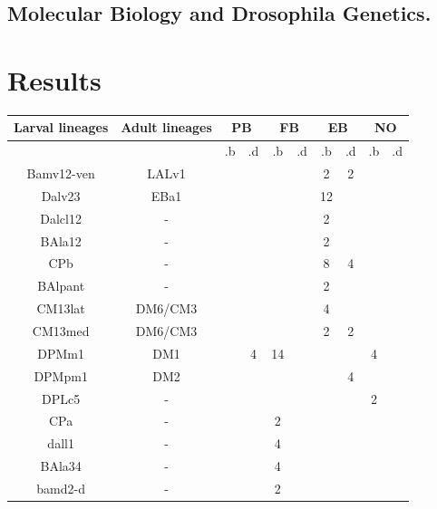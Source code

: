 \documentclass{article}
\begin{document}
\subsection{Molecular Biology and Drosophila Genetics.}


\section{Results}
\begin{table}
\centering
    \begin{tabular}{|c|c|cc|cc|cc|cc|}
     \hline
              Larval lineages & Adult lineages & \multicolumn{2}{c|}{PB}& \multicolumn{2}{c|}{FB}&\multicolumn{2}{c|}{EB}&\multicolumn{2}{c|}{NO}\\
     \hline
                  & & .b &  .d & .b &  .d & .b &  .d & .b &  .d \\
         Bamv12-ven & LALv1 &    &     &    &     &  2 &   2 &    &     \\
            Dalv23 & EBa1 &    &     &    &     & 12 &     &    &     \\
           Dalcl12 & - &    &     &    &     &  2 &     &    &     \\
            BAla12 & - &    &     &    &     &  2 &     &    &     \\
               CPb & -  &    &     &    &     &  8 &   4 &    &     \\
            BAlpant & -  &    &     &    &     &  2 &     &    &     \\
            CM13lat & DM6/CM3 &    &     &    &     &  4 &     &    &     \\
            CM13med & DM6/CM3 &    &     &    &     &  2 &   2 &    &     \\
              DPMm1 & DM1&    &   4 & 14 &     &    &     &  4 &     \\
             DPMpm1 & DM2&   &     &    &     &    &   4 &    &     \\
              DPLc5 & - &    &     &    &     &    &     &  2 &     \\
                CPa & - &   &     &  2 &     &    &     &    &     \\
              dall1 & - &   &     &  4 &     &    &     &    &     \\
             BAla34 & - &   &     &  4 &     &    &     &    &     \\
            bamd2-d & - &   &     &  2 &     &    &     &    &     \\

\end{tabular}
\end{table}
\end{document}
